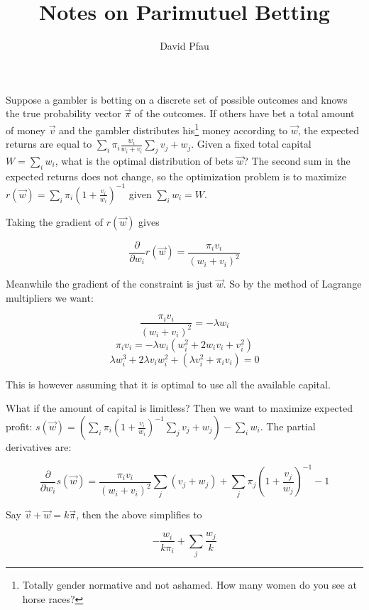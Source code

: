\documentclass[11pt]{article}
\title{Notes on Parimutuel Betting}
\author{David Pfau}
\begin{document}
\maketitle

Suppose a gambler is betting on a discrete set of possible outcomes and knows the true probability vector $\vec{\pi}$ of the outcomes.  If others have bet a total amount of money $\vec{v}$ and the gambler distributes his\footnote{Totally gender normative and not ashamed.  How many women do you see at horse races?} money according to $\vec{w}$, the expected returns are equal to $\sum_i \pi_i \frac{w_i}{w_i + v_i} \sum_{j} v_j + w_j$.  Given a fixed total capital $W = \sum_i w_i$, what is the optimal distribution of bets $\vec{w}$?  The second sum in the expected returns does not change, so the optimization problem is to maximize $r(\vec{w}) =\sum_i \pi_i \left(1 + \frac{v_i}{w_i}\right)^{-1}$ given $\sum_i w_i = W$.

Taking the gradient of $r(\vec{w})$ gives

\[ \frac{\partial}{\partial w_i} r(\vec{w}) = \frac{\pi_i v_i}{(w_i + v_i)^2}\]

Meanwhile the gradient of the constraint is just $\vec{w}$.  So by the method of Lagrange multipliers we want:

\[ \frac{\pi_i v_i}{(w_i + v_i)^2} = -\lambda w_i \]
\[ \pi_i v_i = -\lambda w_i (w_i^2 + 2w_i v_i + v_i^2) \]
\[ \lambda w_i^3 + 2\lambda v_i w_i^2 + (\lambda v_i^2 + \pi_i v_i) = 0\]

This is however assuming that it is optimal to use all the available capital.

What if the amount of capital is limitless?  Then we want to maximize expected profit: $s(\vec{w}) = \left(\sum_i \pi_i \left(1 + \frac{v_i}{w_i}\right)^{-1}\sum_j v_j + w_j \right) - \sum_i w_i$.  The partial derivatives are:

\[ \frac{\partial}{\partial w_i} s(\vec{w}) = \frac{\pi_i v_i}{(w_i + v_i)^2} \sum_j (v_j + w_j) + \sum_j\pi_j \left(1 + \frac{v_j}{w_j}\right)^{-1} - 1 \]

Say $\vec{v} + \vec{w} = k\vec{\pi}$, then the above simplifies to

\[ -\frac{w_i}{k\pi_i} + \sum_j \frac{w_j}{k} \]
\end{document}
